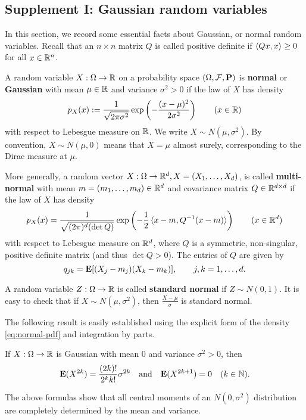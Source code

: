 \subsection{Supplement I: Gaussian random variables}

In this section, we record some essential facts about Gaussian, or normal random variables. Recall that an $n\times n$ matrix $Q$ is called positive definite if $\braket{Qx,x}\ge 0$ for all $x\in\mathbb{R}^n$.

\begin{definition}
A random variable $X:\Omega\to\mathbb{R}$ on a probability space $(\Omega, \mathcal{F}, \mathbf{P})$ is \textbf{normal} or \textbf{Gaussian} with mean $\mu\in\mathbb{R}$ and variance $\sigma^2 > 0$ if the law of $X$ has density
\begin{equation}
\label{eq:normal-pdf}
    p_X(x) := \frac{1}{\sqrt{2\pi\sigma^2}} \exp\left( -\frac{(x-\mu)^2}{2\sigma^2} \right) \qquad (x\in\mathbb{R})
\end{equation}
with respect to Lebesgue measure on $\mathbb{R}$. We write $X\sim N(\mu, \sigma^2)$. By convention, $X\sim N(\mu, 0)$ means that $X = \mu$ almost surely, corresponding to the Dirac measure at $\mu$.

More generally, a random vector $X:\Omega\to\mathbb{R}^d, X=(X_1,\ldots, X_d)$, is called \textbf{multi-normal} with mean $m = (m_1,\ldots, m_d) \in\mathbb{R}^d$ and covariance matrix $Q\in\mathbb{R}^{d\times d}$ if the law of $X$ has density
\begin{equation}
    p_X(x) = \frac{1}{\sqrt{(2\pi)^d (\det Q)}} \exp \left( -\frac{1}{2} \braket{x-m, Q^{-1}(x-m)} \right) \qquad (x\in\mathbb{R}^d)
\end{equation}
with respect to Lebesgue measure on $\mathbb{R}^d$, where $Q$ is a symmetric, non-singular, positive definite matrix (and thus $\det Q>0$). The entries of $Q$ are given by
\begin{equation*}
    q_{jk} = \mathbf{E}[(X_j-m_j)(X_k-m_k)], \qquad j,k=1,\ldots,d.
\end{equation*}
\end{definition}

\begin{remark}
A random variable $Z:\Omega\to\mathbb{R}$ is called \textbf{standard normal} if $Z\sim N(0,1)$. It is easy to check that if $X\sim N(\mu, \sigma^2)$, then $\frac{X-\mu}{\sigma}$ is standard normal.
\end{remark}

The following result is easily established using the explicit form of the density \eqref{eq:normal-pdf} and integration by parts.
\begin{proposition}
\label{prop:gauss-moments}
If $X:\Omega\to\mathbb{R}$ is Gaussian with mean $0$ and variance $\sigma^2 >0$, then
\begin{equation}
    \mathbf{E}(X^{2k}) = \frac{(2k)!}{2^k k!} \sigma^{2k} \quad \text{and} \quad \mathbf{E}(X^{2k+1}) = 0 \quad (k\in\mathbb{N}).
\end{equation}
\end{proposition}
The above formulas show that all central moments of an $N(0,\sigma^2)$ distribution are completely determined by the mean and variance.

